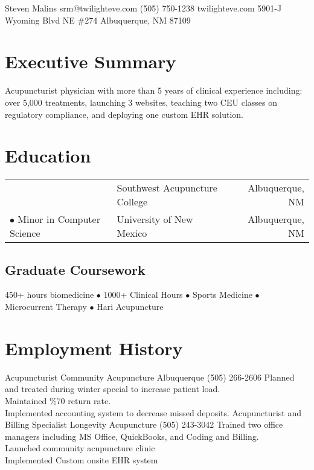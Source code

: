 \documentclass{myres}
\makeatletter
\newcommand{\myfname}{Steven}
\newcommand{\mylname}{Malins}
\newcommand{\myemail}{srm@twilighteve.com}
\newcommand{\myweb}{twilighteve.com}
\newcommand{\myphone}{(505) 750-1238}
\newcommand{\myaddressA}{5901-J Wyoming Blvd NE \#274}
\newcommand{\myaddressB}{Albuquerque, NM 87109}
\makeatother
\begin{document}
\pagestyle{empty}

\mktop
{\myfname}
{\mylname}
{\myemail}
{\myphone}
{\myweb}
{\myaddressA}
{\myaddressB}

\myendsec
\section{Executive Summary}
\vspace{-.5em}
Acupuncturist physician with more than 5 years of clinical experience including: over 5,000 treatments, launching 3 websites, teaching two CEU classes on regulatory compliance, and deploying one custom EHR solution.
\myendsec

\section{Education}
\vspace{-1em}
\begin{tabularx}{\textwidth}{@{} l l R}
 & Southwest Acupuncture College & Albuquerque, NM\\
 $\bullet$ Minor in Computer Science & University of New Mexico & Albuquerque, NM\\
\end{tabularx}
\vspace{-1em}
\subsection{Graduate Coursework}
\vspace{-.8em}
450+ hours biomedicine $\bullet$ 1000+ Clinical Hours $\bullet$ Sports Medicine $\bullet$ Microcurrent Therapy $\bullet$ Hari Acupuncture
\myendsec

\section{Employment History}
{Acupuncturist}
{Community Acupuncture Albuquerque}
{(505) 266-2606}
{
  Planned and treated during winter special to increase patient load.\\
  Maintained \%70 return rate.\\
  Implemented accounting system to decrease missed deposits.
}
{Acupuncturist and Billing Specialist}
{Longevity Acupuncture}
{(505) 243-3042}
{
  Trained two office managers including MS Office, QuickBooks, and
  Coding and Billing.\\
  Launched community acupuncture clinic\\
  Implemented Custom onsite EHR system
}
\myendsec
\end{document}

